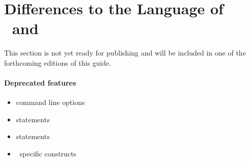 \section{Differences to the Language of  \iclingo\ and \oclingo}\label{sec:iclingo:tri}

This section is not yet ready for publishing
and will be included in one of the forthcoming editions of this guide.

\paragraph{Deprecated features}
\begin{itemize}
\item command line options
\item {} statements
\item {} statements
\item \oclingo\ specific constructs
\end{itemize}

